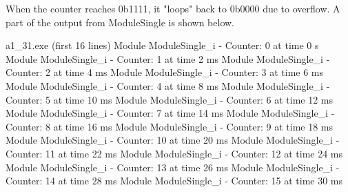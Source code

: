 \documentclass[../main.tex]{subfiles}
\begin{document}
When the counter reaches 0b1111, it "loops" back to 0b0000 due to overflow. A part of the output from ModuleSingle is shown below.

\begin{mintedterminal}{a1\_31.exe (first 16 lines)}
Module ModuleSingle_i - Counter: 0 at time 0 s
Module ModuleSingle_i - Counter: 1 at time 2 ms
Module ModuleSingle_i - Counter: 2 at time 4 ms
Module ModuleSingle_i - Counter: 3 at time 6 ms
Module ModuleSingle_i - Counter: 4 at time 8 ms
Module ModuleSingle_i - Counter: 5 at time 10 ms
Module ModuleSingle_i - Counter: 6 at time 12 ms
Module ModuleSingle_i - Counter: 7 at time 14 ms
Module ModuleSingle_i - Counter: 8 at time 16 ms
Module ModuleSingle_i - Counter: 9 at time 18 ms
Module ModuleSingle_i - Counter: 10 at time 20 ms
Module ModuleSingle_i - Counter: 11 at time 22 ms
Module ModuleSingle_i - Counter: 12 at time 24 ms
Module ModuleSingle_i - Counter: 13 at time 26 ms
Module ModuleSingle_i - Counter: 14 at time 28 ms
Module ModuleSingle_i - Counter: 15 at time 30 ms
\end{mintedterminal}
\end{document}
